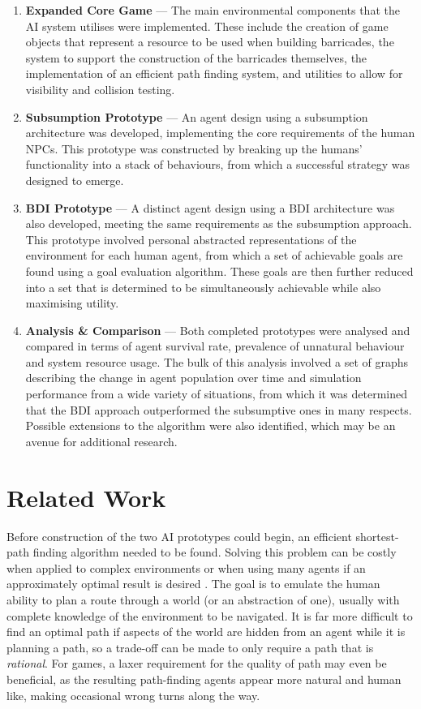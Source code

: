 \documentclass[a4paper,12pt]{article}
\newcommand{\deliverable}[2]{\item \textbf{#1} --- #2}
\begin{document}
\begin{enumerate}
  \deliverable{Expanded Core Game}
  {The main environmental components that the AI system utilises were implemented. These include the creation of game objects that represent a resource to be used when building barricades, the system to support the construction of the barricades themselves, the implementation of an efficient path finding system, and utilities to allow for visibility and collision testing.}

  \deliverable{Subsumption Prototype}
  {An agent design using a subsumption architecture was developed, implementing the core requirements of the human NPCs. This prototype was constructed by breaking up the humans' functionality into a stack of behaviours, from which a successful strategy was designed to emerge.}

  \deliverable{BDI Prototype}
  {A distinct agent design using a BDI architecture was also developed, meeting the same requirements as the subsumption approach. This prototype involved personal abstracted representations of the environment for each human agent, from which a set of achievable goals are found using a goal evaluation algorithm. These goals are then further reduced into a set that is determined to be simultaneously achievable while also maximising utility.}

  \deliverable{Analysis \& Comparison}
  {Both completed prototypes were analysed and compared in terms of agent survival rate, prevalence of unnatural behaviour and system resource usage. The bulk of this analysis involved a set of graphs describing the change in agent population over time and simulation performance from a wide variety of situations, from which it was determined that the BDI approach outperformed the subsumptive ones in many respects. Possible extensions to the algorithm were also identified, which may be an avenue for additional research.}
\end{enumerate}

\section{Related Work}
Before construction of the two AI prototypes could begin, an efficient shortest-path finding algorithm needed to be found. Solving this problem can be costly when applied to complex environments or when using many agents if an approximately optimal result is desired \cite[p.~95-99]{russell10}. The goal is to emulate the human ability to plan a route through a world (or an abstraction of one), usually with complete knowledge of the environment to be navigated. It is far more difficult to find an optimal path if aspects of the world are hidden from an agent while it is planning a path, so a trade-off can be made to only require a path that is \emph{rational}. For games, a laxer requirement for the quality of path may even be beneficial, as the resulting path-finding agents appear more natural and human like, making occasional wrong turns along the way.
\end{document}
